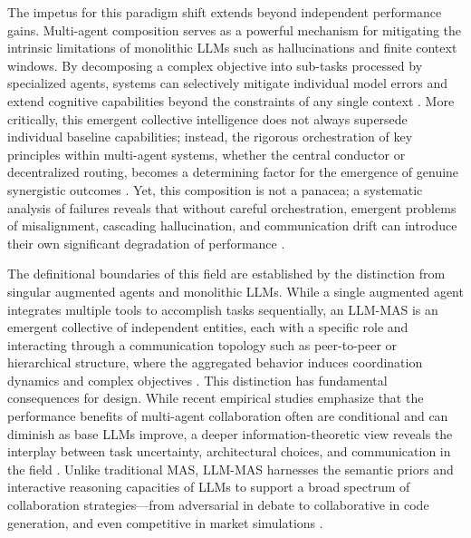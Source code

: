 \documentclass[11pt,a4paper]{article}
\begin{document}
The impetus for this paradigm shift extends beyond independent performance gains. Multi-agent composition serves as a powerful mechanism for mitigating the intrinsic limitations of monolithic LLMs such as hallucinations and finite context windows. By decomposing a complex objective into sub-tasks processed by specialized agents, systems can selectively mitigate individual model errors and extend cognitive capabilities beyond the constraints of any single context \cite{arxiv:2503.13657v3,arxiv:2506.06843v3}. More critically, this emergent collective intelligence does not always supersede individual baseline capabilities; instead, the rigorous orchestration of key principles within multi-agent systems, whether the central conductor or decentralized routing, becomes a determining factor for the emergence of genuine synergistic outcomes \cite{arxiv:2505.19591v2}. Yet, this composition is not a panacea; a systematic analysis of failures reveals that without careful orchestration, emergent problems of misalignment, cascading hallucination, and communication drift can introduce their own significant degradation of performance \cite{arxiv:2503.13657v3,arxiv:2602.01011v4}.

The definitional boundaries of this field are established by the distinction from singular augmented agents and monolithic LLMs. While a single augmented agent integrates multiple tools to accomplish tasks sequentially, an LLM-MAS is an emergent collective of independent entities, each with a specific role and interacting through a communication topology such as peer-to-peer or hierarchical structure, where the aggregated behavior induces coordination dynamics and complex objectives \cite{arxiv:2504.00587v2}. This distinction has fundamental consequences for design. While recent empirical studies emphasize that the performance benefits of multi-agent collaboration often are conditional and can diminish as base LLMs improve, a deeper information-theoretic view reveals the interplay between task uncertainty, architectural choices, and communication in the field \cite{arxiv:2505.18286v1,arxiv:2512.08296v3}. Unlike traditional MAS, LLM-MAS harnesses the semantic priors and interactive reasoning capacities of LLMs to support a broad spectrum of collaboration strategies---from adversarial in debate to collaborative in code generation, and even competitive in market simulations \cite{arxiv:2501.06322v1}.
\end{document}
